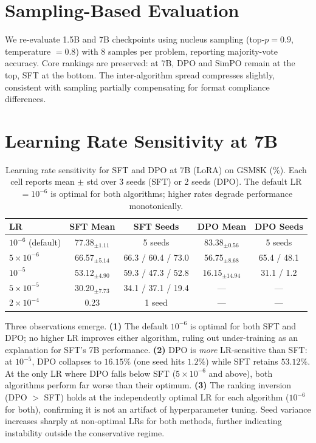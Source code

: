 \documentclass{article}
\begin{document}
\section{Sampling-Based Evaluation}
\label{app:sampling_eval}

We re-evaluate 1.5B and 7B checkpoints using nucleus sampling (top-$p = 0.9$, temperature $= 0.8$) with 8 samples per problem, reporting majority-vote accuracy.
Core rankings are preserved: at 7B, DPO and SimPO remain at the top, SFT at the bottom. The inter-algorithm spread compresses slightly, consistent with sampling partially compensating for format compliance differences.

\section{Learning Rate Sensitivity at 7B}
\label{app:lr_ablation}

\begin{table}[ht]
\centering
\caption{Learning rate sensitivity for SFT and DPO at 7B (LoRA) on GSM8K (\%). Each cell reports mean $\pm$ std over 3 seeds (SFT) or 2 seeds (DPO). The default LR $= 10^{-6}$ is optimal for both algorithms; higher rates degrade performance monotonically.}
\label{tab:lr_ablation}
\small
\begin{tabular}{@{}lcccc@{}}
\toprule
\textbf{LR} & \textbf{SFT Mean} & \textbf{SFT Seeds} & \textbf{DPO Mean} & \textbf{DPO Seeds} \\
\midrule
$10^{-6}$ (default) & 77.38$_{\pm 1.11}$ & 5 seeds & 83.38$_{\pm 0.56}$ & 5 seeds \\
$5{\times}10^{-6}$ & 66.57$_{\pm 5.14}$ & 66.3 / 60.4 / 73.0 & 56.75$_{\pm 8.68}$ & 65.4 / 48.1 \\
$10^{-5}$ & 53.12$_{\pm 4.90}$ & 59.3 / 47.3 / 52.8 & 16.15$_{\pm 14.94}$ & 31.1 / \phantom{0}1.2 \\
$5{\times}10^{-5}$ & 30.20$_{\pm 7.73}$ & 34.1 / 37.1 / 19.4 & --- & --- \\
$2{\times}10^{-4}$ & \phantom{0}0.23 & 1 seed & --- & --- \\
\bottomrule
\end{tabular}
\end{table}

Three observations emerge. \textbf{(1)} The default $10^{-6}$ is optimal for both SFT and DPO; no higher LR improves either algorithm, ruling out under-training as an explanation for SFT's 7B performance. \textbf{(2)} DPO is \emph{more} LR-sensitive than SFT: at $10^{-5}$, DPO collapses to $16.15\%$ (one seed hits $1.2\%$) while SFT retains $53.12\%$. At the only LR where DPO falls below SFT ($5{\times}10^{-6}$ and above), both algorithms perform far worse than their optimum. \textbf{(3)} The ranking inversion (DPO $>$ SFT) holds at the independently optimal LR for each algorithm ($10^{-6}$ for both), confirming it is not an artifact of hyperparameter tuning. Seed variance increases sharply at non-optimal LRs for both methods, further indicating instability outside the conservative regime.
\end{document}
